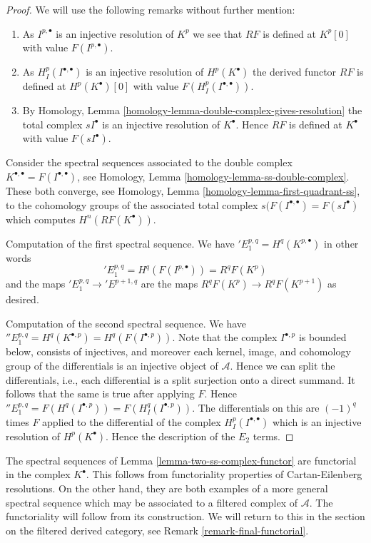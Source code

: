 \begin{proof}
We will use the following remarks without further mention:
\begin{enumerate}
\item As $I^{p, \bullet}$ is an injective resolution of
$K^p$ we see that $RF$ is defined at $K^p[0]$
with value $F(I^{p, \bullet})$.
\item As $H^p_{I}(I^{\bullet, \bullet})$ is an injective resolution of
$H^p(K^\bullet)$ the derived functor $RF$ is defined at $H^p(K^\bullet)[0]$
with value $F(H^p_{I}(I^{\bullet, \bullet}))$.
\item By
Homology, Lemma \ref{homology-lemma-double-complex-gives-resolution}
the total complex $sI^\bullet$ is an injective resolution of
$K^\bullet$. Hence $RF$ is defined at $K^\bullet$ with value
$F(sI^\bullet)$.
\end{enumerate}
Consider the spectral sequences associated to
the double complex $K^{\bullet, \bullet} = F(I^{\bullet, \bullet})$, see
Homology, Lemma \ref{homology-lemma-ss-double-complex}.
These both converge, see
Homology, Lemma \ref{homology-lemma-first-quadrant-ss},
to the cohomology groups of the associated total complex
$s(F(I^{\bullet, \bullet}) = F(sI^\bullet)$ which computes
$H^n(RF(K^\bullet))$.

\medskip\noindent
Computation of the first spectral sequence. We have
${}'E_1^{p, q} = H^q(K^{p, \bullet})$ in other words
$$
{}'E_1^{p, q} = H^q(F(I^{p, \bullet})) = R^qF(K^p)
$$
and the maps ${}'E_1^{p, q} \to {}'E^{p + 1, q}$ are the maps
$R^qF(K^p) \to R^qF(K^{p + 1})$ as desired.

\medskip\noindent
Computation of the second spectral sequence. We have
${}''E_1^{p, q} = H^q(K^{\bullet, p}) = H^q(F(I^{\bullet, p}))$.
Note that the complex $I^{\bullet, p}$ is bounded below,
consists of injectives, and moreover each kernel, image, and
cohomology group of the differentials is an injective object
of $\mathcal{A}$. Hence we can split the differentials, i.e.,
each differential is a split surjection onto a direct summand.
It follows that the same is true after applying $F$. Hence
${}''E_1^{p, q} = F(H^q(I^{\bullet, p})) = F(H^q_I(I^{\bullet, p}))$.
The differentials on this are $(-1)^q$ times $F$ applied to
the differential of the complex $H^p_{I}(I^{\bullet, \bullet})$
which is an injective resolution of $H^p(K^\bullet)$. Hence the
description of the $E_2$ terms.
\end{proof}

\begin{remark}
\label{remark-functorial-ss}
The spectral sequences of Lemma \ref{lemma-two-ss-complex-functor}
are functorial in the complex $K^\bullet$. This follows from functoriality
properties of Cartan-Eilenberg resolutions. On the other hand, they are
both examples of a more general spectral sequence which may be associated
to a filtered complex of $\mathcal{A}$. The functoriality will follow from
its construction. We will return to this in the section on the filtered
derived category, see Remark \ref{remark-final-functorial}.
\end{remark}










